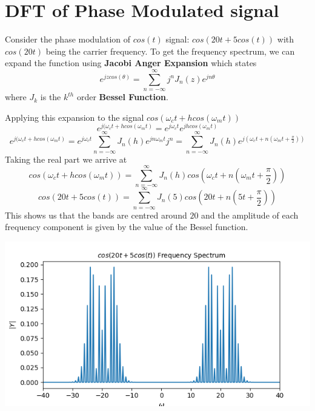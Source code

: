 \documentclass[12pt, a4paper]{report}
\begin{document}
\section*{DFT of Phase Modulated signal}
Consider the phase modulation of $cos(t)$ signal: $cos(20t + 5cos(t))$ with $cos(20t)$ being the carrier frequency. To get the frequency spectrum, we can expand the function using \textbf{Jacobi Anger Expansion} which states
\begin{equation}
e^{jzcos(\theta)} = \sum^{\infty}_{n = - \infty} j^n J_n(z)e^{jn\theta}
\end{equation}
where $J_k$ is the $k^{th}$ order \textbf{Bessel Function}. 

Applying this expansion to the signal $cos(\omega_ct + hcos(\omega_mt))$ 
\begin{equation*}
e^{j(\omega_ct + hcos(\omega_mt)} = e^{j\omega_ct}e^{jhcos(\omega_mt)} 
\end{equation*}
\begin{equation*}
e^{j(\omega_ct + hcos(\omega_mt)} = e^{j\omega_ct}\sum_{n = -\infty}^{\infty}J_n(h)e^{jn\omega_mt}j^n = \sum_{n = -\infty}^{\infty}J_n(h)e^{j(\omega_ct + n(\omega_mt + \frac{\pi}{2}))}
\end{equation*}
Taking the real part we arrive at 
\begin{equation}
cos(\omega_ct + hcos(\omega_mt)) = \sum_{n = -\infty}^{\infty}J_n(h)cos(\omega_ct + n(\omega_mt + \frac{\pi}{2}))
\end{equation}
\begin{equation*}
cos(20t + 5cos(t)) = \sum_{n = -\infty}^{\infty}J_n(5)cos(20t + n(5t + \frac{\pi}{2}))
\end{equation*}
This shows us that the bands are centred around $20$ and the amplitude of each frequency component is given by the value of the Bessel function.
\clearpage
\begin{center}
	\includegraphics[scale=0.72]{Figure_9.png} 
	\label{fig:rawdata}
\end{center}
\end{document}
